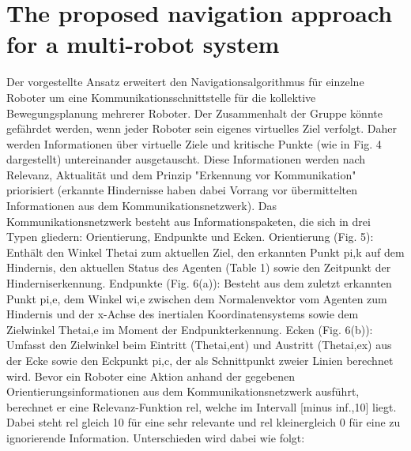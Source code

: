 \documentclass[conference]{IEEEtran}
\begin{document}
\section{The proposed navigation approach for a multi-robot system}
Der vorgestellte Ansatz erweitert den Navigationsalgorithmus für einzelne Roboter um eine Kommunikationsschnittstelle für die kollektive Bewegungsplanung mehrerer Roboter. Der Zusammenhalt der Gruppe könnte gefährdet werden, wenn jeder Roboter sein eigenes virtuelles Ziel verfolgt. Daher werden Informationen über virtuelle Ziele und kritische Punkte (wie in Fig. 4 dargestellt) untereinander ausgetauscht. Diese Informationen werden nach Relevanz, Aktualität und dem Prinzip "Erkennung vor Kommunikation" priorisiert (erkannte Hindernisse haben dabei Vorrang vor übermittelten Informationen aus dem Kommunikationsnetzwerk).
Das Kommunikationsnetzwerk besteht aus Informationspaketen, die sich in drei Typen gliedern: Orientierung, Endpunkte und Ecken.
Orientierung (Fig. 5): Enthält den Winkel Thetai zum aktuellen Ziel, den erkannten Punkt pi,k auf dem Hindernis, den aktuellen Status des Agenten (Table 1) sowie den Zeitpunkt der Hinderniserkennung.
Endpunkte (Fig. 6(a)): Besteht aus dem zuletzt erkannten Punkt pi,e, dem Winkel wi,e zwischen dem Normalenvektor vom Agenten zum Hindernis und der x-Achse des inertialen Koordinatensystems sowie dem Zielwinkel Thetai,e im Moment der Endpunkterkennung.
Ecken (Fig. 6(b)): Umfasst den Zielwinkel beim Eintritt (Thetai,ent) und Austritt (Thetai,ex) aus der Ecke sowie den Eckpunkt pi,c, der als Schnittpunkt zweier Linien berechnet wird.
Bevor ein Roboter eine Aktion anhand der gegebenen Orientierungsinformationen aus dem Kommunikationsnetzwerk ausführt, berechnet er eine Relevanz-Funktion rel, welche im Intervall [minus inf.,10] liegt. Dabei steht rel gleich 10 für eine sehr relevante und rel kleinergleich 0 für eine zu ignorierende Information. Unterschieden wird dabei wie folgt:
\end{document}
